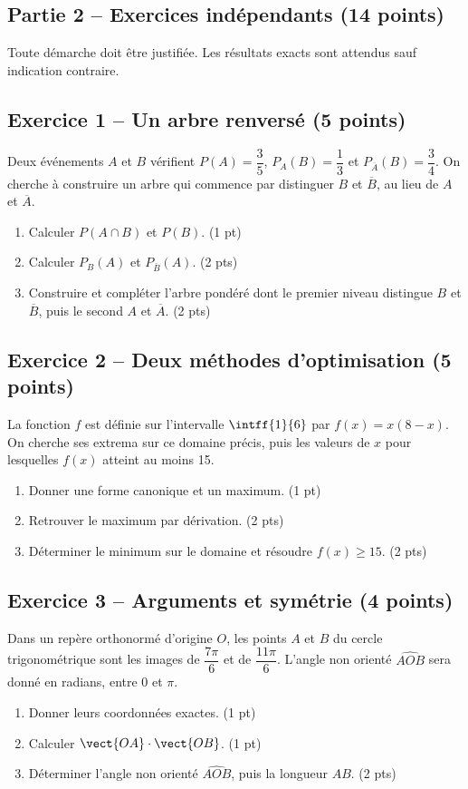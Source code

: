 \mxnewpage\subsection*{Partie 2 -- Exercices indépendants (14 points)}
Toute démarche doit être justifiée. Les résultats exacts sont attendus sauf indication contraire.
\subsection*{Exercice 1 -- Un arbre renversé (5 points)}
Deux événements $A$ et $B$ vérifient $P(A)=\dfrac35$, $P_A(B)=\dfrac13$ et $P_{\overline A}(B)=\dfrac34$. On cherche à construire un arbre qui commence par distinguer $B$ et $\overline B$, au lieu de $A$ et $\overline A$.
\begin{enumerate}
\item Calculer $P(A\cap B)$ et $P(B)$. \hfill(1 pt)
\item Calculer $P_B(A)$ et $P_{\overline B}(A)$. \hfill(2 pts)
\item Construire et compléter l’arbre pondéré dont le premier niveau distingue $B$ et $\overline B$, puis le second $A$ et $\overline A$. \hfill(2 pts)
\end{enumerate}
\subsection*{Exercice 2 -- Deux méthodes d’optimisation (5 points)}
La fonction $f$ est définie sur l’intervalle $\intff{1}{6}$ par $f(x)=x(8-x)$. On cherche ses extrema sur ce domaine précis, puis les valeurs de $x$ pour lesquelles $f(x)$ atteint au moins 15.
\begin{enumerate}
\item Donner une forme canonique et un maximum. \hfill(1 pt)
\item Retrouver le maximum par dérivation. \hfill(2 pts)
\item Déterminer le minimum sur le domaine et résoudre $f(x)\geq15$. \hfill(2 pts)
\end{enumerate}
\subsection*{Exercice 3 -- Arguments et symétrie (4 points)}
Dans un repère orthonormé d’origine $O$, les points $A$ et $B$ du cercle trigonométrique sont les images de $\dfrac{7\pi}6$ et de $\dfrac{11\pi}6$. L’angle non orienté $\widehat{AOB}$ sera donné en radians, entre 0 et $\pi$.
\begin{enumerate}
\item Donner leurs coordonnées exactes. \hfill(1 pt)
\item Calculer $\vect{OA}\cdot\vect{OB}$. \hfill(1 pt)
\item Déterminer l’angle non orienté $\widehat{AOB}$, puis la longueur $AB$. \hfill(2 pts)
\end{enumerate}
